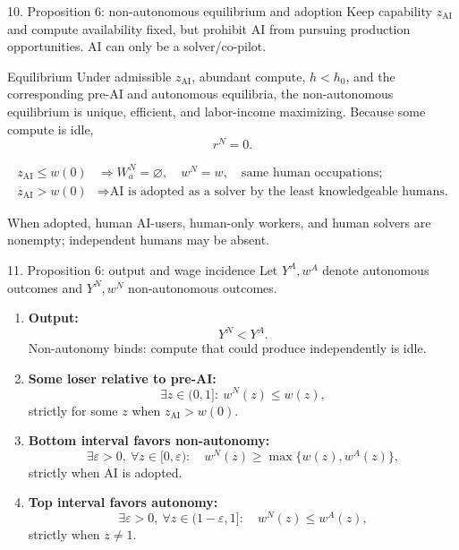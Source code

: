 \documentclass[aspectratio=169,11pt]{beamer}
\newcommand{\zAI}{z_{\mathrm{AI}}}
\newcommand{\wA}{w^{A}}
\newcommand{\wN}{w^{N}}
\newcommand{\YA}{Y^{A}}
\newcommand{\YN}{Y^{N}}
\begin{document}
\begin{frame}{10. Proposition 6: non-autonomous equilibrium and adoption}
  Keep capability $\zAI$ and compute availability fixed, but prohibit AI from pursuing production opportunities. AI can only be a solver/co-pilot.

  \begin{block}{Equilibrium}
    Under admissible $\zAI$, abundant compute, $h<h_0$, and the corresponding pre-AI and autonomous equilibria, the non-autonomous equilibrium is unique, efficient, and labor-income maximizing. Because some compute is idle,
    \[
      \boxed{r^N=0}.
    \]
  \end{block}

  \begin{align*}
    \zAI\le w(0)
      &\Longrightarrow W_a^N=\varnothing,
        \quad\wN=w,\quad\text{same human occupations};\\
    \zAI>w(0)
      &\Longrightarrow \text{AI is adopted as a solver by the least knowledgeable humans.}
  \end{align*}

  \small
  When adopted, human AI-users, human-only workers, and human solvers are nonempty; independent humans may be absent.
\end{frame}

\begin{frame}{11. Proposition 6: output and wage incidence}
  Let $\YA,\wA$ denote autonomous outcomes and $\YN,\wN$ non-autonomous outcomes.

  \begin{enumerate}\small
    \item \textbf{Output:}
      \[
        \boxed{\YN<\YA}.
      \]
      Non-autonomy binds: compute that could produce independently is idle.
    \item \textbf{Some loser relative to pre-AI:}
      \[
        \exists z\in(0,1]:\ \wN(z)\le w(z),
      \]
      strictly for some $z$ when $\zAI>w(0)$.
    \item \textbf{Bottom interval favors non-autonomy:}
      \[
        \exists\varepsilon>0,\ \forall z\in[0,\varepsilon):\quad
        \wN(z)\ge\max\{w(z),\wA(z)\},
      \]
      strictly when AI is adopted.
    \item \textbf{Top interval favors autonomy:}
      \[
        \exists\varepsilon>0,\ \forall z\in(1-\varepsilon,1]:\quad
        \wN(z)\le\wA(z),
      \]
      strictly when $z\ne1$.
  \end{enumerate}
\end{frame}
\end{document}
